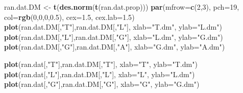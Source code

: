 \documentclass[twocolumn]{article}
\newenvironment{Shaded}{\begin{snugshade}}{\end{snugshade}}
\newcommand{\KeywordTok}[1]{\textcolor[rgb]{0.13,0.29,0.53}{\textbf{{#1}}}}
\newcommand{\DataTypeTok}[1]{\textcolor[rgb]{0.13,0.29,0.53}{{#1}}}
\newcommand{\DecValTok}[1]{\textcolor[rgb]{0.00,0.00,0.81}{{#1}}}
\newcommand{\FloatTok}[1]{\textcolor[rgb]{0.00,0.00,0.81}{{#1}}}
\newcommand{\StringTok}[1]{\textcolor[rgb]{0.31,0.60,0.02}{{#1}}}
\newcommand{\NormalTok}[1]{{#1}}
\begin{document}
\begin{Shaded}
\begin{Highlighting}[]
\NormalTok{ran.dat.DM <-}\StringTok{ }\KeywordTok{t}\NormalTok{(}\KeywordTok{des.norm}\NormalTok{(}\KeywordTok{t}\NormalTok{(ran.dat.prop)))}
\KeywordTok{par}\NormalTok{(}\DataTypeTok{mfrow=}\KeywordTok{c}\NormalTok{(}\DecValTok{2}\NormalTok{,}\DecValTok{3}\NormalTok{), }\DataTypeTok{pch=}\DecValTok{19}\NormalTok{, }\DataTypeTok{col=}\KeywordTok{rgb}\NormalTok{(}\DecValTok{0}\NormalTok{,}\DecValTok{0}\NormalTok{,}\DecValTok{0}\NormalTok{,}\FloatTok{0.5}\NormalTok{),}
    \DataTypeTok{cex=}\FloatTok{1.5}\NormalTok{, }\DataTypeTok{cex.lab=}\FloatTok{1.5}\NormalTok{)}
\KeywordTok{plot}\NormalTok{(ran.dat.DM[,}\StringTok{"T"}\NormalTok{],ran.dat.DM[,}\StringTok{"L"}\NormalTok{],}
    \DataTypeTok{xlab=}\StringTok{"T.dm"}\NormalTok{, }\DataTypeTok{ylab=}\StringTok{"L.dm"}\NormalTok{)}
\KeywordTok{plot}\NormalTok{(ran.dat.DM[,}\StringTok{"L"}\NormalTok{],ran.dat.DM[,}\StringTok{"G"}\NormalTok{],}
    \DataTypeTok{xlab=}\StringTok{"L.dm"}\NormalTok{, }\DataTypeTok{ylab=}\StringTok{"G.dm"}\NormalTok{)}
\KeywordTok{plot}\NormalTok{(ran.dat.DM[,}\StringTok{"G"}\NormalTok{],ran.dat.DM[,}\StringTok{"A"}\NormalTok{],}
    \DataTypeTok{xlab=}\StringTok{"G.dm"}\NormalTok{, }\DataTypeTok{ylab=}\StringTok{"A.dm"}\NormalTok{)}

\KeywordTok{plot}\NormalTok{(ran.dat[,}\StringTok{"T"}\NormalTok{],ran.dat.DM[,}\StringTok{"T"}\NormalTok{],}
    \DataTypeTok{xlab=}\StringTok{"T"}\NormalTok{, }\DataTypeTok{ylab=}\StringTok{"T.dm"}\NormalTok{)}
\KeywordTok{plot}\NormalTok{(ran.dat[,}\StringTok{"L"}\NormalTok{],ran.dat.DM[,}\StringTok{"L"}\NormalTok{],}
    \DataTypeTok{xlab=}\StringTok{"L"}\NormalTok{, }\DataTypeTok{ylab=}\StringTok{"L.dm"}\NormalTok{)}
\KeywordTok{plot}\NormalTok{(ran.dat[,}\StringTok{"G"}\NormalTok{],ran.dat.DM[,}\StringTok{"G"}\NormalTok{],}
    \DataTypeTok{xlab=}\StringTok{"G"}\NormalTok{, }\DataTypeTok{ylab=}\StringTok{"G.dm"}\NormalTok{)}
\end{Highlighting}
\end{Shaded}
\end{document}
